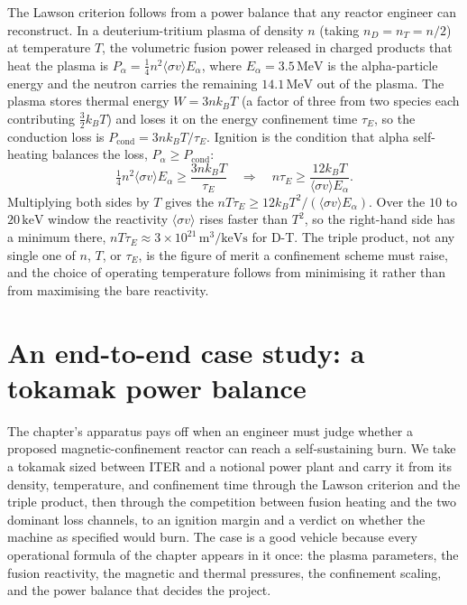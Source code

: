 \begin{mastery}
The Lawson criterion follows from a power balance that any reactor engineer
can reconstruct. In a deuterium-tritium plasma of density $n$ (taking
$n_D = n_T = n/2$) at temperature $T$, the volumetric fusion power released
in charged products that heat the plasma is $P_\alpha = \tfrac14 n^{2}
\langle\sigma v\rangle E_\alpha$, where $E_\alpha = 3.5\,\si{\mega
\electronvolt}$ is the alpha-particle energy and the neutron carries the
remaining $14.1\,\si{\mega\electronvolt}$ out of the plasma. The plasma
stores thermal energy $W = 3nk_{B}T$ (a factor of three from two species
each contributing $\tfrac32 k_{B}T$) and loses it on the energy confinement
time $\tau_E$, so the conduction loss is $P_{\mathrm{cond}} = 3nk_{B}T/
\tau_E$. Ignition is the condition that alpha self-heating balances the
loss, $P_\alpha \ge P_{\mathrm{cond}}$:
\[
\tfrac14 n^{2}\langle\sigma v\rangle E_\alpha \ge \frac{3nk_{B}T}{\tau_E}
\quad\Longrightarrow\quad
n\tau_E \ge \frac{12 k_{B}T}{\langle\sigma v\rangle E_\alpha}.
\]
Multiplying both sides by $T$ gives the 
$n T \tau_E \ge 12 k_{B}T^{2}/(\langle\sigma v\rangle E_\alpha)$. Over the
$10$ to $20\,\si{\kilo\electronvolt}$ window the reactivity $\langle\sigma
v\rangle$ rises faster than $T^{2}$, so the right-hand side has a minimum
there, $n T \tau_E \approx 3\times 10^{21}\,\si{\meter\cubed\per\kilo
\electronvolt\second}$ for D-T. The triple product, not any single one of
$n$, $T$, or $\tau_E$, is the figure of merit a confinement scheme must
raise, and the choice of operating temperature follows from minimising it
rather than from maximising the bare reactivity.
\end{mastery}

\section{An end-to-end case study: a tokamak power balance}

The chapter's apparatus pays off when an engineer must judge whether a
proposed magnetic-confinement reactor can reach a self-sustaining burn. We
take a tokamak sized between ITER and a notional power plant and carry it
from its density, temperature, and confinement time through the Lawson
criterion and the triple product, then through the competition between
fusion heating and the two dominant loss channels, to an ignition margin
and a verdict on whether the machine as specified would burn. The case is a
good vehicle because every operational formula of the chapter appears in it
once: the plasma parameters, the fusion reactivity, the magnetic and
thermal pressures, the confinement scaling, and the power balance that
decides the project.

